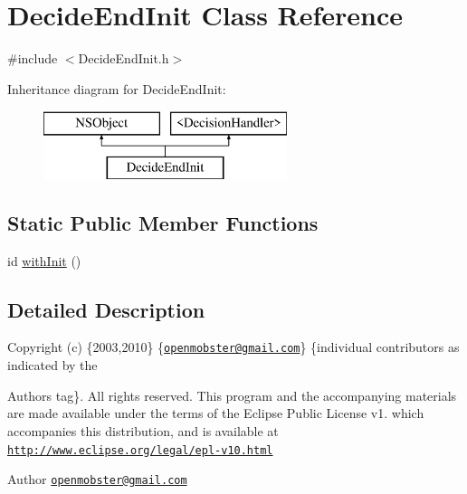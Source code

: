 \hypertarget{interface_decide_end_init}{
\section{\-Decide\-End\-Init \-Class \-Reference}
\label{interface_decide_end_init}
}


{\ttfamily \#include $<$\-Decide\-End\-Init.\-h$>$}

\-Inheritance diagram for \-Decide\-End\-Init\-:\begin{figure}[H]
\begin{center}
\leavevmode
\includegraphics[height=2.000000cm]{interface_decide_end_init}
\end{center}
\end{figure}
\subsection*{\-Static \-Public \-Member \-Functions}
\begin{DoxyCompactItemize}
\item 
id \hyperlink{interface_decide_end_init_a112e4fd0f92b3ae2532c926bd04b22a0}{with\-Init} ()
\end{DoxyCompactItemize}


\subsection{\-Detailed \-Description}
\-Copyright (c) \{2003,2010\} \{\href{mailto:openmobster@gmail.com}{\tt openmobster@gmail.\-com}\} \{individual contributors as indicated by the \begin{DoxyAuthor}{\-Authors}
tag\}. \-All rights reserved. \-This program and the accompanying materials are made available under the terms of the \-Eclipse \-Public \-License v1. which accompanies this distribution, and is available at \href{http://www.eclipse.org/legal/epl-v10.html}{\tt http\-://www.\-eclipse.\-org/legal/epl-\/v10.\-html}
\end{DoxyAuthor}
\begin{DoxyAuthor}{\-Author}
\href{mailto:openmobster@gmail.com}{\tt openmobster@gmail.\-com} 
\end{DoxyAuthor}


